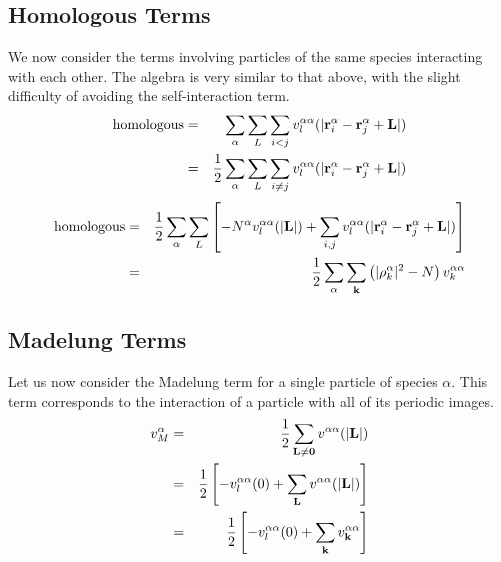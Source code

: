 \documentclass{article}
\begin{document}
\subsection{Homologous Terms}
We now consider the terms involving particles of the same species
interacting with each other.  The algebra is very similar to that
above, with the slight difficulty of avoiding the self-interaction term.
\begin{eqnarray}
\text{homologous} & = & \sum_\alpha \sum_L \sum_{i<j} v_l^{\alpha
  \alpha}(|\mathbf{r}_i^\alpha - \mathbf{r}_j^\alpha + \mathbf{L}|) \\
 & = & \frac{1}{2} \sum_\alpha \sum_L \sum_{i\neq j} v_l^{\alpha
  \alpha}(|\mathbf{r}_i^\alpha - \mathbf{r}_j^\alpha + \mathbf{L}|) 
\end{eqnarray}
\begin{eqnarray}
\text{homologous} & = & \frac{1}{2} \sum_\alpha \sum_L 
\left[
-N^\alpha v_l^{\alpha \alpha}(|\mathbf{L}|)  + \sum_{i,j} v^{\alpha \alpha}_l(|\mathbf{r}_i^\alpha - \mathbf{r}_j^\alpha + \mathbf{L}|)
  \right] \\
& = & \frac{1}{2} \sum_\alpha \sum_{\mathbf{k}} \left(|\rho_k^\alpha|^2 - N
\right) v_k^{\alpha \alpha}
\end{eqnarray}

\subsection{Madelung Terms}
Let us now consider the Madelung term for a single particle of species
$\alpha$.  This term corresponds to the interaction of a particle with
all of its periodic images.  
\begin{eqnarray}
v_M^{\alpha} & = & \frac{1}{2} \sum_{\mathbf{L} \neq \mathbf{0}} v^{\alpha
  \alpha}(|\mathbf{L}|) \\
& = & \frac{1}{2} \left[ -v_l^{\alpha \alpha}(0) + \sum_{\mathbf{L}} v^{\alpha
  \alpha}(|\mathbf{L}|) \right] \\
& = & \frac{1}{2} \left[ -v_l^{\alpha \alpha}(0) + \sum_{\mathbf{k}} v^{\alpha
  \alpha}_{\mathbf{k}} \right]  
\end{eqnarray}
\end{document}
